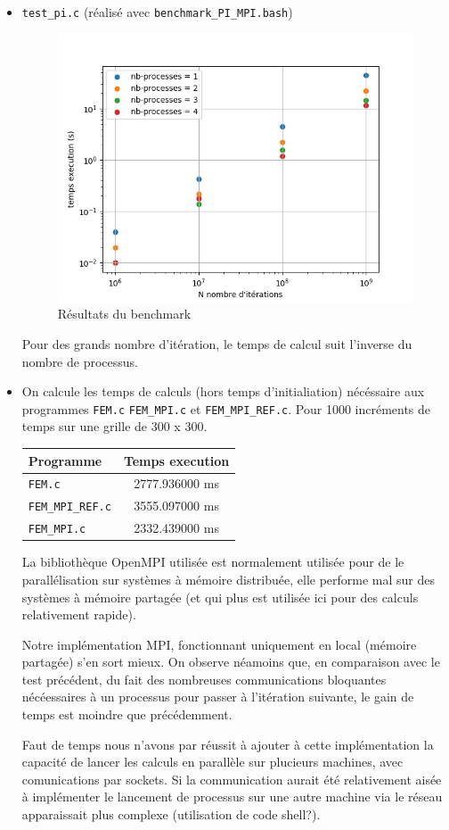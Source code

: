\documentclass[a4paper]{article}
\begin{document}
\begin{itemize}
    \item \verb|test_pi.c| (réalisé avec \verb|benchmark_PI_MPI.bash|)
    \begin{figure}[!ht]
        \centering
        \includegraphics[width=0.5\linewidth]{../MPI_Kahn_C/test/data-benchmark/plot_pi_benchmark.png}
        \caption{Résultats du benchmark}
    \end{figure}

    Pour des grands nombre d'itération, le temps de calcul suit l'inverse du nombre de processus.

    \item On calcule les temps de calculs (hors temps d'initialiation) nécéssaire aux programmes \verb|FEM.c| \verb|FEM_MPI.c| et \verb|FEM_MPI_REF.c|. Pour 1000 incréments de temps sur une grille de 300 x 300.

    \begin{table}[!ht]
        \centering
        \begin{tabular}{lc}
            Programme & Temps execution \\
            \midrule
            \verb|FEM.c|         & 2777.936000 ms \\
            \verb|FEM_MPI_REF.c|  & 3555.097000 ms \\
            \verb|FEM_MPI.c|      & 2332.439000 ms \\
        \end{tabular}
    \end{table}

    La bibliothèque OpenMPI utilisée est normalement utilisée pour de le parallélisation sur systèmes à mémoire distribuée, elle performe mal sur des systèmes à mémoire partagée (et qui plus est utilisée ici pour des calculs relativement rapide).

    Notre implémentation MPI, fonctionnant uniquement en local (mémoire partagée) s'en sort mieux. On observe néamoins que, en comparaison avec le test précédent, du fait des nombreuses communications bloquantes nécéessaires à un processus pour passer à l'itération suivante, le gain de temps est moindre que précédemment.

    Faut de temps nous n'avons par réussit à ajouter à cette implémentation la capacité de lancer les calculs en parallèle sur plucieurs machines, avec comunications par sockets. Si la communication aurait été relativement aisée à implémenter le lancement de processus sur une autre machine via le réseau apparaissait plus complexe (utilisation de code shell?).
    

\end{itemize}
\end{document}
